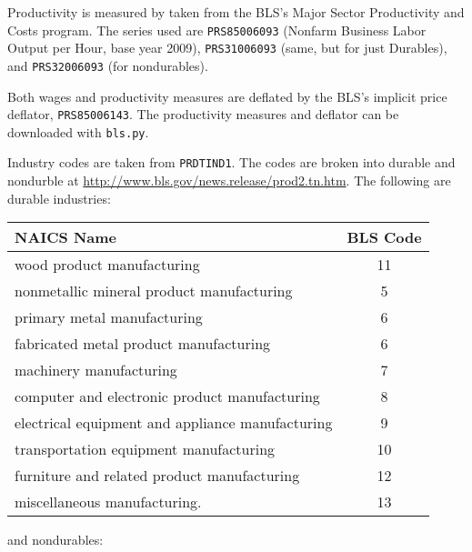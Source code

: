\documentclass[11pt]{article}
\begin{document}
Productivity is measured by taken from the BLS's Major Sector Productivity and Costs program.
The series used are \texttt{PRS85006093} (Nonfarm Business Labor Output per Hour, base year 2009),
\texttt{PRS31006093} (same, but for just Durables), and \texttt{PRS32006093} (for nondurables).

Both wages and productivity measures are deflated by the BLS's implicit price deflator, \texttt{PRS85006143}.
The productivity measures and deflator can be downloaded with \texttt{bls.py}.

Industry codes are taken from \texttt{PRDTIND1}.
The codes are broken into durable and nondurble at \href{http://www.bls.gov/news.release/prod2.tn.htm}{http://www.bls.gov/news.release/prod2.tn.htm}.
The following are durable industries:

\begin{center}
\begin{tabular}{lc} \toprule
NAICS Name                                      & BLS Code \\ \midrule
wood product manufacturing                      & 11       \\
nonmetallic mineral product manufacturing       & 5        \\
primary metal manufacturing                     & 6        \\
fabricated metal product manufacturing          & 6        \\
machinery manufacturing                         & 7        \\
computer and electronic product manufacturing   & 8        \\
electrical equipment and appliance manufacturing& 9        \\
transportation equipment manufacturing          & 10       \\
furniture and related product manufacturing     & 12       \\
miscellaneous manufacturing.                    & 13       \\
\end{tabular}
\end{center}
and nondurables:
\end{document}
